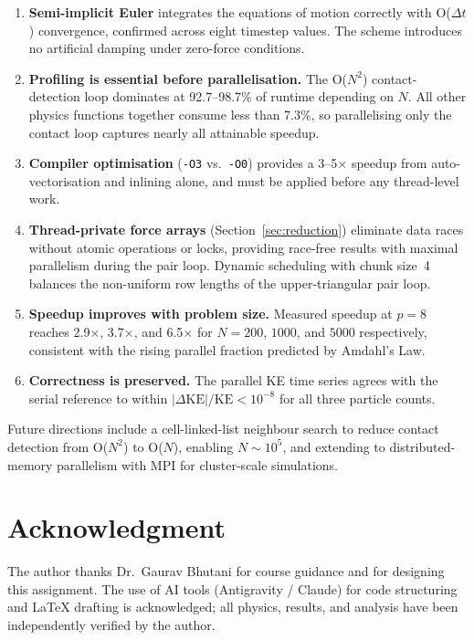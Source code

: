 \documentclass[journal]{IEEEtran}
\begin{document}
\begin{enumerate}

\item \textbf{Semi-implicit Euler} integrates the equations of motion
correctly with O($\Delta t$) convergence, confirmed across eight
timestep values.  The scheme introduces no artificial damping under
zero-force conditions.

\item \textbf{Profiling is essential before parallelisation.}  The
O($N^2$) contact-detection loop dominates at 92.7--98.7\% of runtime
depending on $N$.  All other physics functions together consume less
than 7.3\%, so parallelising only the contact loop captures nearly
all attainable speedup.

\item \textbf{Compiler optimisation} (\texttt{-O3} vs.\ \texttt{-O0})
provides a 3--5$\times$ speedup from auto-vectorisation and inlining
alone, and must be applied before any thread-level work.

\item \textbf{Thread-private force arrays} (Section~\ref{sec:reduction})
eliminate data races without atomic operations or locks, providing
race-free results with maximal parallelism during the pair loop.
Dynamic scheduling with chunk size~4 balances the non-uniform row
lengths of the upper-triangular pair loop.

\item \textbf{Speedup improves with problem size.}  Measured speedup
at $p=8$ reaches 2.9$\times$, 3.7$\times$, and 6.5$\times$ for
$N=200$, $1000$, and $5000$ respectively, consistent with the rising
parallel fraction predicted by Amdahl's Law.

\item \textbf{Correctness is preserved.}  The parallel KE time series
agrees with the serial reference to within
$|\Delta\mathrm{KE}|/\mathrm{KE} < 10^{-8}$ for all three particle
counts.

\end{enumerate}

Future directions include a cell-linked-list neighbour search to
reduce contact detection from O($N^2$) to O($N$), enabling
$N \sim 10^5$, and extending to distributed-memory parallelism with
MPI for cluster-scale simulations.

\section*{Acknowledgment}
The author thanks Dr.\ Gaurav Bhutani for course guidance and for
designing this assignment.  The use of AI tools (Antigravity / Claude)
for code structuring and LaTeX drafting is acknowledged; all physics,
results, and analysis have been independently verified by the author.
\end{document}
